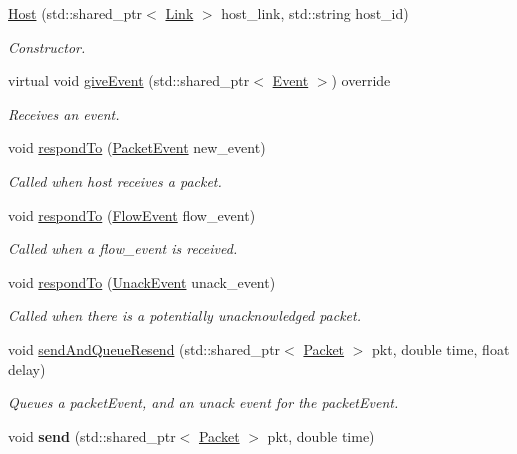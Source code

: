 \begin{DoxyCompactItemize}
\item 
\hyperlink{classHost_afde96dd6239594d91697006a850bea5b}{\-Host} (std\-::shared\-\_\-ptr$<$ \hyperlink{classLink}{\-Link} $>$ host\-\_\-link, std\-::string host\-\_\-id)
\begin{DoxyCompactList}\small\item\em \-Constructor. \end{DoxyCompactList}\item 
virtual void \hyperlink{classHost_a658a8bee30dfb9e6ff7abc26620f88ff}{give\-Event} (std\-::shared\-\_\-ptr$<$ \hyperlink{classEvent}{\-Event} $>$) override
\begin{DoxyCompactList}\small\item\em \-Receives an event. \end{DoxyCompactList}\item 
void \hyperlink{classHost_a1386df4e48df0cf8e7252c55fa9e0f2b}{respond\-To} (\hyperlink{classPacketEvent}{\-Packet\-Event} new\-\_\-event)
\begin{DoxyCompactList}\small\item\em \-Called when host receives a packet. \end{DoxyCompactList}\item 
void \hyperlink{classHost_a15013b657e880635a087ce41d9bccaf8}{respond\-To} (\hyperlink{classFlowEvent}{\-Flow\-Event} flow\-\_\-event)
\begin{DoxyCompactList}\small\item\em \-Called when a flow\-\_\-event is received. \end{DoxyCompactList}\item 
void \hyperlink{classHost_af19765406b0fc694ec4122ef57d3bbb3}{respond\-To} (\hyperlink{classUnackEvent}{\-Unack\-Event} unack\-\_\-event)
\begin{DoxyCompactList}\small\item\em \-Called when there is a potentially unacknowledged packet. \end{DoxyCompactList}\item 
void \hyperlink{classHost_a029c7f389a580fc7e53da38a698d0d9a}{send\-And\-Queue\-Resend} (std\-::shared\-\_\-ptr$<$ \hyperlink{classPacket}{\-Packet} $>$ pkt, double time, float delay)
\begin{DoxyCompactList}\small\item\em \-Queues a packet\-Event, and an unack event for the packet\-Event. \end{DoxyCompactList}\item 
\hypertarget{classHost_a7aeac15cbcd5d64ff8c2af090d8db0c4}{void {\bfseries send} (std\-::shared\-\_\-ptr$<$ \hyperlink{classPacket}{\-Packet} $>$ pkt, double time)}\label{classHost_a7aeac15cbcd5d64ff8c2af090d8db0c4}


\end{DoxyCompactItemize}
